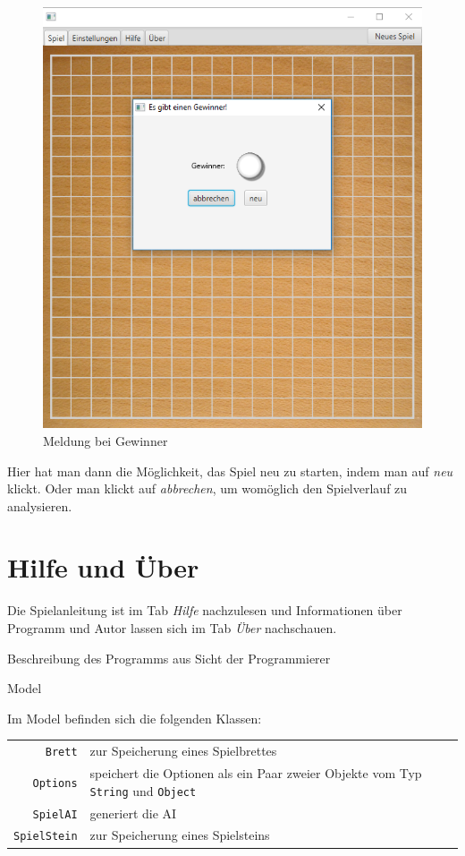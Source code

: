 \documentclass[11pt]{article}
\newcommand{\1}{{\mathds{1}}}
\newcommand{\imagewidth}{.8\linewidth}
\begin{document}
	\begin{figure}[H]
		\centering
		\includegraphics[width=\imagewidth]{gewinner.png}
		\caption{Meldung bei Gewinner}
		\label{gewinner}
	\end{figure}

	Hier hat man dann die Möglichkeit, das Spiel neu zu starten, indem man auf \textit{neu} klickt.
	Oder man klickt auf \textit{abbrechen}, um womöglich den Spielverlauf zu analysieren. 
	
	\section{Hilfe und Über}
	Die Spielanleitung ist im Tab \textit{Hilfe} nachzulesen und Informationen über Programm und Autor lassen sich im Tab \textit{Über} nachschauen. 
	
	\pagebreak
	
	Beschreibung des Programms aus Sicht der Programmierer
	
	Model
	
	Im Model befinden sich die folgenden Klassen:
	
	\begin{center}
		\begin{tabular}{r l}
			\lstinline|Brett| & zur Speicherung eines Spielbrettes \\
			\lstinline|Options| & speichert die Optionen als ein Paar zweier Objekte vom Typ \lstinline|String| und \lstinline|Object| \\
			\lstinline|SpielAI| & generiert die AI \\
			\lstinline|SpielStein| & zur Speicherung eines Spielsteins
		\end{tabular}
	\end{center}
	
\end{document}
